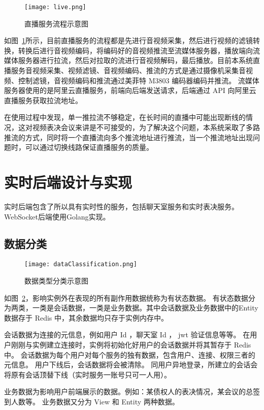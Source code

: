   \begin{figure}[!htp]
    \centering
    \texttt{[image: live.png]}
    \caption{直播服务流程示意图}
    \label{fig:live}
  \end{figure}

  如图~\ref{fig:live}所示，目前直播服务的流程都是先进行音视频采集，然后进行视频的滤镜转换，转换后进行音视频编码，将编码好的音视频推流至流媒体服务器，播放端向流媒体服务器进行拉流，然后对拉取的流进行音视频解码，最后播放。目前本系统直播服务音视频采集、视频滤镜、音视频编码、推流的方式是通过摄像机采集音视频、控制滤镜，音视频编码和推流通过美菲特 M3803 编码器编码并推流。
  流媒体服务器使用的是阿里云直播服务，前端向后端发送请求，后端通过 API 向阿里云直播服务获取拉流地址。

  在使用过程中发现，单一推拉流不够稳定，在长时间的直播中可能出现断线的情况，这对视频表决会议来讲是不可接受的，为了解决这个问题，本系统采取了多路推流的方式，同时将一个直播流向多个推流地址进行推流，当一个推流地址出现问题时，可以通过切换线路保证直播服务的质量。

  \section{实时后端设计与实现}
  实时后端包含了所以具有实时性的服务，包括聊天室服务和实时表决服务。WebSocket后端使用Golang实现。

  \subsection{数据分类}

\begin{figure}[!htp]
  \centering
  \texttt{[image: dataClassification.png]}
  \caption[数据分类]
    {数据类型分类示意图}
 \label{fig:dataClassification}
\end{figure}

如图~\ref{fig:dataClassification}，影响实例外在表现的所有副作用数据统称为有状态数据。
有状态数据分为两类，一类是会话数据，一类是业务数据。其中会话数据及业务数据中的Entity数据存于 Redis 中，其余数据均只存于实例内存中。

会话数据为连接的元信息，例如用户 Id ，聊天室 Id ， jwt 验证信息等等。
在用户刚刚与实例建立连接时，实例将初始化好用户的会话数据并将其暂存于 Redis 中。
会话数据为每个用户对每个服务的独有数据，包含用户、连接、权限三者的元信息。
用户下线后，会话数据将会被清除。
同用户异地登录，所建立的会话会将原有会话顶替下线（实时服务一账号只可一人用）。

业务数据为影响用户前端展示的数据。例如：某债权人的表决情况，某会议的总签到人数等。
业务数据又分为 View 和 Entity 两种数据。

